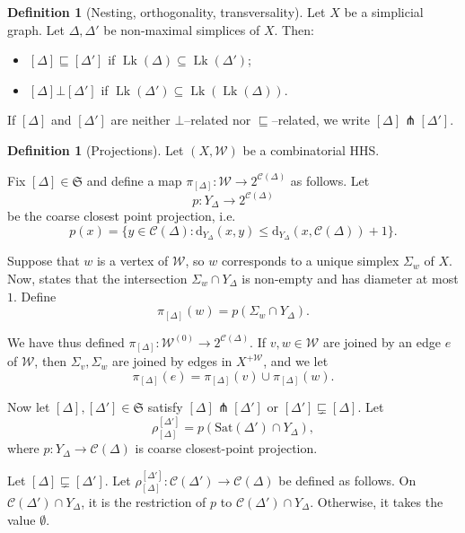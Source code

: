 \documentclass[svgnames]{amsart}
\theoremstyle{plain}
\theoremstyle{definition}
\newtheorem{defn}[thm]{Definition}
\newcommand{\frakS}{\mathfrak S}
\newcommand{\C}{\mathcal C}
\newcommand{\dist}{\mathrm{d}}
\newcommand{\nest}{\sqsubseteq}
\newcommand{\propnest}{\sqsubsetneq}
\newcommand{\orth}{\bot}
\newcommand{\transverse}{\pitchfork}
\newcommand{\link}{\operatorname{Lk}}
\newcommand{\duaug}[2]{{#1}^{+{#2}}}
\newcommand{\Sat}{\mathrm{Sat}}
\newcommand{\W}{\mathcal{W}}
\begin{document}
\begin{defn}[Nesting, orthogonality, transversality]\label{defn:nest_orth}
Let $X$ be a simplicial graph.  Let $\Delta,\Delta'$ be non-maximal simplices of $X$.  Then:
\begin{itemize}
     \item $[\Delta]\nest[\Delta']$ if $\link(\Delta)\subseteq\link(\Delta')$;
     \item $[\Delta]\orth[\Delta']$ if $\link(\Delta')\subseteq \link(\link(\Delta))$.
\end{itemize}
If $[\Delta]$ and $[\Delta']$ are neither $\orth$--related nor $\nest$--related, we write 
$[\Delta]\transverse[\Delta']$.
\end{defn}





\begin{defn}[Projections]\label{defn:projections}
Let $(X,\W)$ be a combinatorial HHS.  

Fix $[\Delta]\in\frakS$ and define a map $\pi_{[\Delta]}:\W\to 2^{\C  (\Delta)}$ as follows. Let
$$p:Y_\Delta\to2^{\C  (\Delta)}$$
be the coarse closest point projection, i.e. 
$$p(x)=\{y\in\C  (\Delta):\dist_{Y_\Delta}(x,y)\le\dist_{Y_\Delta}(x,\C  (\Delta))+1\}.$$

Suppose that $w$ is a vertex of $\W$, so $w$ corresponds to a unique simplex $\Sigma_w$ of $X$. Now, \cite[Lemma 1.15]{BHMS} states that the intersection $\Sigma_w\cap Y_\Delta$ is non-empty and has diameter at most $1$. Define $$\pi_{[\Delta]}(w)=p(\Sigma_w\cap Y_\Delta).$$

We have thus defined  $\pi_{[\Delta]}:\W^{(0)}\to 2^{\C  (\Delta)}$. If $v,w\in \W$ are joined by an edge $e$ of $\W$, then $\Sigma_v,\Sigma_w$ are joined by edges in $\duaug{X}{\W}$, and we let
$$\pi_{[\Delta]}(e)=\pi_{[\Delta]}(v)\cup\pi_{[\Delta]}(w).$$

Now let $[\Delta],[\Delta']\in\frakS$ satisfy $[\Delta]\transverse[\Delta']$ or $[\Delta']\propnest [\Delta]$. Let $$\rho^{[\Delta']}_{[\Delta]}=p(\Sat(\Delta')\cap Y_\Delta),$$ where $p:Y_\Delta\to\C  (\Delta)$ is coarse closest-point projection. 

Let $[\Delta]\propnest [\Delta']$. Let $\rho^{[\Delta']}_{[\Delta]}:\C  (\Delta')\to \C  (\Delta)$ be defined as follows.  On $\C  (\Delta')\cap Y_\Delta$, it is the restriction of $p$ to $\C  (\Delta')\cap Y_\Delta$. Otherwise, it takes the value $\emptyset$.
\end{defn}
\end{document}
